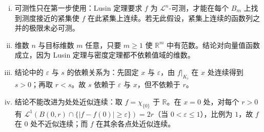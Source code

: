 \documentclass[../../main.tex]{subfiles}%
\begin{document}
\begin{remark}\label{remark:ch01-thm-1-37-条件}
\begin{enumerate}[(i)]
\item 可测性只在第一步使用：Lusin 定理要求 $f$ 为 $\mathcal{L}^{n}$-可测，才能在每个 $B_m$ 上找到测度接近的紧集使 $f$ 在此紧集上连续。若无此假设，紧集上连续的函数列之并的极限未必可测。
\item 维数 $n$ 与目标维数 $m$ 任意，只要 $m\geqslant1$ 使 $\mathbb{R}^m$ 中有范数。结论对向量值函数成立，因为 Lusin 定理与密度定理都不依赖值域的维数。
\item 结论中的 $\varepsilon$ 与 $s$ 的依赖关系为：先固定 $x$ 与 $\varepsilon$，由 $f|_{K_i}$ 在 $x$ 处连续得到 $s>0$；再取 $r<s$。故 $s$ 依赖于 $\varepsilon$ 与 $x$，但不依赖于 $r$。
\item 结论不能改进为处处近似连续：取 $f=\chi_{\{0\}}$ 于 $\mathbb{R}$。在 $x=0$ 处，对每个 $r>0$ 有 $\mathcal{L}^{1}(B(0,r)\cap\{\lvert f-f(0)\rvert\geqslant\varepsilon\})=2r$（当 $0<\varepsilon\leqslant1$），比例为 $1$，故 $f$ 在 $0$ 处不近似连续；而 $f$ 在其余各点处近似连续。
\end{enumerate}
\end{remark}
\end{document}

